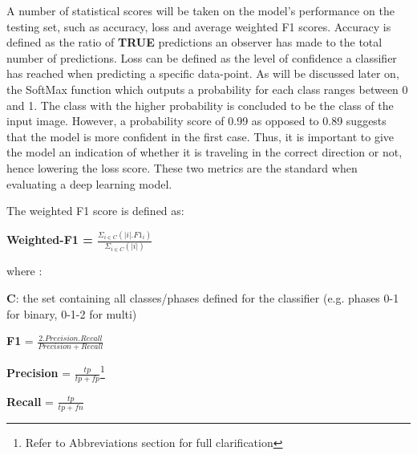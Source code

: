 \documentclass[a4paper]{article}
\begin{document}
            A number of statistical scores will be taken on the model's performance on the testing set, such as accuracy, loss and average weighted F1 scores. Accuracy is defined as the ratio of \textbf{TRUE} predictions an observer has made to the total number of predictions. Loss can be defined as the level of confidence a classifier has reached when predicting a specific data-point. As will be discussed later on, the SoftMax function which outputs a probability for each class ranges between 0 and 1. The class with the higher probability is concluded to be the class of the input image. However, a probability score of 0.99 as opposed to 0.89 suggests that the model is more confident in the first case. Thus, it is important to give the model an indication of whether it is traveling in the correct direction or not, hence lowering the loss score. These two metrics are the standard when evaluating a deep learning model. 
            \vspace{3mm}
            
            The weighted F1 score is defined as:
            \begin{center}
                \textbf{Weighted-F1 = {\huge $ \frac{\Sigma_{i \in C}  (\vert{i}\vert . F1_{i})}{\Sigma_{i \in C}  (\vert{i}\vert)}$}}\\
            \end{center}
            where :
            \vspace{3mm}
            
            \textbf{C}: the set containing all classes/phases defined for the classifier (e.g. phases 0-1 for binary, 0-1-2 for multi)
            
            \vspace{3mm}
            
            \textbf{F1} = { $\frac{2 . Precision . Recall}{Precision + Recall}$}
            
            \vspace{3mm}
            
            \textbf{Precision} = { $ \frac{tp}{tp + fp}$}\footnote{Refer to Abbreviations section for full clarification}
            
            \vspace{3mm}
            
            \textbf{Recall} = { $ \frac{tp}{tp + fn}$}
            
            \vspace{3mm}
\end{document}
